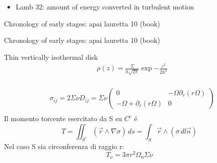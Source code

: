 \begin{workout}
	\begin{itemize}
		\item Lamb 32: amount of energy converted in turbulent motion
	\end{itemize}
\end{workout}

\begin{workout}
	Chronology of  early stages: apai lauretta 10 (book)
\end{workout}

\begin{workout}
	Chronology of  early stages: apai lauretta 10 (book)
\end{workout}

\begin{workout}
	Thin vertically isothermal disk
	\begin{align}
		&\rho(z)=\frac{\Sigma}{h\sqrt{2\pi}}\exp{-\frac{z^2}{2h^2}}\\
		&
	\end{align}
\end{workout}

\begin{workout}
	
\end{workout}

\begin{workout}
	\begin{align}
		&\sigma_{ij}=2\Sigma\nu D_{ij}=\Sigma\nu\begin{pmatrix}0&-\Omega\partial_r(r\Omega)\\-\Omega+\partial_r(r\Omega)&0
		\end{pmatrix}\\
	\end{align}
	Il momento torcente esercitato da S su $C^c$ \'e
	\begin{equation}
	T=\iint_{S^c}(\vec{r}\wedge\nabla\sigma)\,ds=\int_S\vec{r}\wedge(\sigma\,dl\vec{n})
	\end{equation}
	Nel caso S sia circonferenza di raggio r:
	\begin{equation}
	T_{\nu}=3\pi r^2\Omega_0\Sigma\nu
	\end{equation}
\end{workout}

